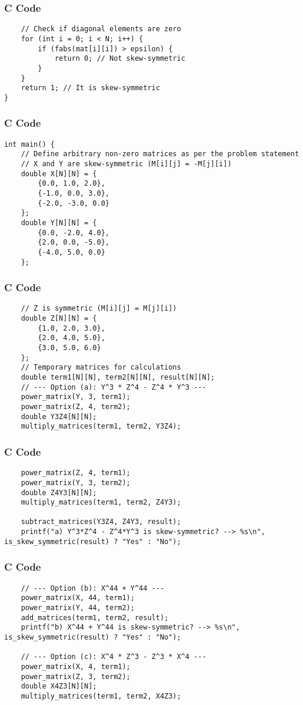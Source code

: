 \documentclass{beamer}
\begin{document}
\begin{frame}[fragile]
\frametitle{C Code}
\begin{lstlisting}
    // Check if diagonal elements are zero
    for (int i = 0; i < N; i++) {
        if (fabs(mat[i][i]) > epsilon) {
            return 0; // Not skew-symmetric
        }
    }
    return 1; // It is skew-symmetric
}
\end{lstlisting}
\end{frame}

\begin{frame}[fragile]
\frametitle{C Code}
\begin{lstlisting}
int main() {
    // Define arbitrary non-zero matrices as per the problem statement
    // X and Y are skew-symmetric (M[i][j] = -M[j][i])
    double X[N][N] = {
        {0.0, 1.0, 2.0},
        {-1.0, 0.0, 3.0},
        {-2.0, -3.0, 0.0}
    };
    double Y[N][N] = {
        {0.0, -2.0, 4.0},
        {2.0, 0.0, -5.0},
        {-4.0, 5.0, 0.0}
    };
\end{lstlisting}
\end{frame}

\begin{frame}[fragile]
\frametitle{C Code}
\begin{lstlisting}    
    // Z is symmetric (M[i][j] = M[j][i])
    double Z[N][N] = {
        {1.0, 2.0, 3.0},
        {2.0, 4.0, 5.0},
        {3.0, 5.0, 6.0}
    };
    // Temporary matrices for calculations
    double term1[N][N], term2[N][N], result[N][N];
    // --- Option (a): Y^3 * Z^4 - Z^4 * Y^3 ---
    power_matrix(Y, 3, term1);
    power_matrix(Z, 4, term2);
    double Y3Z4[N][N];
    multiply_matrices(term1, term2, Y3Z4);
\end{lstlisting}
\end{frame}

\begin{frame}[fragile]
\frametitle{C Code}
\begin{lstlisting} 
    power_matrix(Z, 4, term1);
    power_matrix(Y, 3, term2);
    double Z4Y3[N][N];
    multiply_matrices(term1, term2, Z4Y3);

    subtract_matrices(Y3Z4, Z4Y3, result);
    printf("a) Y^3*Z^4 - Z^4*Y^3 is skew-symmetric? --> %s\n", is_skew_symmetric(result) ? "Yes" : "No");
\end{lstlisting}
\end{frame}

\begin{frame}[fragile]
\frametitle{C Code}
\begin{lstlisting}
    // --- Option (b): X^44 + Y^44 ---
    power_matrix(X, 44, term1);
    power_matrix(Y, 44, term2);
    add_matrices(term1, term2, result);
    printf("b) X^44 + Y^44 is skew-symmetric? --> %s\n", is_skew_symmetric(result) ? "Yes" : "No");

    // --- Option (c): X^4 * Z^3 - Z^3 * X^4 ---
    power_matrix(X, 4, term1);
    power_matrix(Z, 3, term2);
    double X4Z3[N][N];
    multiply_matrices(term1, term2, X4Z3);
\end{lstlisting}
\end{frame}
\end{document}
